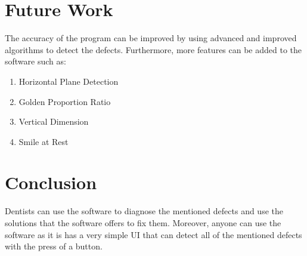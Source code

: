 \documentclass[conference,twocolumn]{IEEEtran}
\begin{document}
\section{Future Work}
The accuracy of the program can be improved by using advanced and improved algorithms to detect the defects. Furthermore, more features can be added to the software such as:
\begin{enumerate}
    \item Horizontal Plane Detection
    \item Golden Proportion Ratio
    \item Vertical Dimension 
    \item Smile at Rest
\end{enumerate}

\section{Conclusion}
Dentists can use the software to diagnose the mentioned defects and use the solutions that the software offers to fix them. Moreover, anyone can use the software as it is has a very simple UI that can detect all of the mentioned defects with the press of a button.
\end{document}
